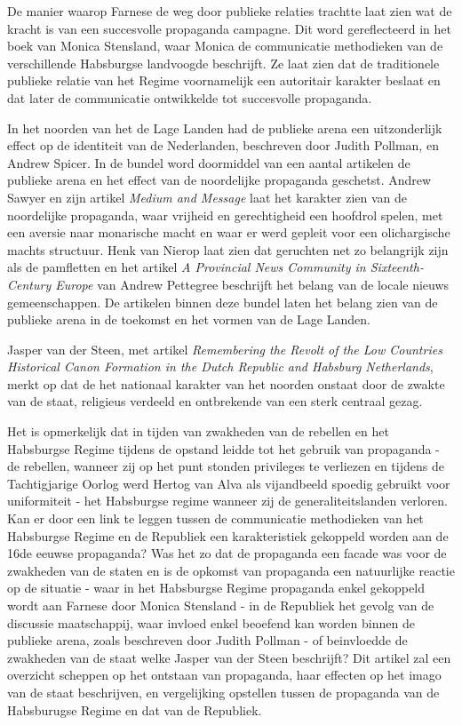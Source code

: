 \documentclass[12pt]{amsart}
\theoremstyle{definition}
\theoremstyle{remark}
\numberwithin{equation}{section}
\begin{document}
De manier waarop Farnese de weg door publieke relaties trachtte laat zien wat de kracht is van een succesvolle
propaganda campagne. Dit word gereflecteerd in het boek van Monica Stensland, waar Monica de communicatie methodieken
van de verschillende Habsburgse landvoogde beschrijft. Ze laat zien dat de traditionele publieke relatie van het Regime
voornamelijk een autoritair karakter beslaat en dat later de communicatie ontwikkelde tot succesvolle propaganda.

In het noorden van het de Lage Landen had de publieke arena een uitzonderlijk effect op de identiteit van de
Nederlanden, beschreven door Judith Pollman, en Andrew Spicer. In de bundel word doormiddel van een aantal artikelen de
publieke arena en het effect van de noordelijke propaganda geschetst. Andrew Sawyer en zijn artikel \textit{Medium and
     Message} laat het karakter zien van de noordelijke propaganda, waar vrijheid en gerechtigheid een hoofdrol
spelen, met een aversie naar monarische macht en waar er werd gepleit voor een olichargische machts structuur.	Henk
van Nierop laat zien dat geruchten net zo belangrijk zijn als de pamfletten en het artikel \textit{A Provincial News
     Community in Sixteenth-Century Europe} van Andrew Pettegree beschrijft het belang van de locale nieuws
gemeenschappen. De artikelen binnen deze bundel laten het belang zien van de publieke arena in de toekomst en het
vormen van de Lage Landen.

Jasper van der Steen, met artikel \textit{Remembering the Revolt of the Low
     Countries Historical Canon Formation in the Dutch Republic and Habsburg Netherlands}, merkt op dat de het
nationaal karakter van het noorden onstaat door de zwakte van de staat, religieus verdeeld en ontbrekende van een sterk
centraal gezag.

Het is opmerkelijk dat in tijden van zwakheden van de rebellen en het Habsburgse Regime tijdens de opstand leidde tot
het gebruik van propaganda - de rebellen, wanneer zij op het punt stonden privileges te verliezen en tijdens de
Tachtigjarige Oorlog werd Hertog van Alva als vijandbeeld spoedig gebruikt voor uniformiteit - het Habsburgse regime
wanneer zij de generaliteitslanden verloren. Kan er door een link te leggen tussen de communicatie methodieken van het
Habsburgse Regime en de Republiek een karakteristiek gekoppeld worden aan de 16de eeuwse propaganda?
Was het zo dat de propaganda een facade was voor de zwakheden van de staten en is de opkomst van propaganda
een natuurlijke reactie op de situatie - waar in het Habsburgse Regime propaganda enkel gekoppeld wordt aan Farnese
door Monica Stensland - in de Republiek het gevolg van de discussie maatschappij, waar invloed enkel beoefend kan
worden binnen de publieke arena, zoals beschreven door Judith Pollman - of beinvloedde de zwakheden van de staat welke
Jasper van der Steen beschrijft? Dit artikel zal een overzicht scheppen op het ontstaan van propaganda, haar effecten
op het imago van de staat beschrijven, en vergelijking opstellen tussen de propaganda van de Habsburugse Regime en dat
van de Republiek.

\printbibliography{}
\end{document}
